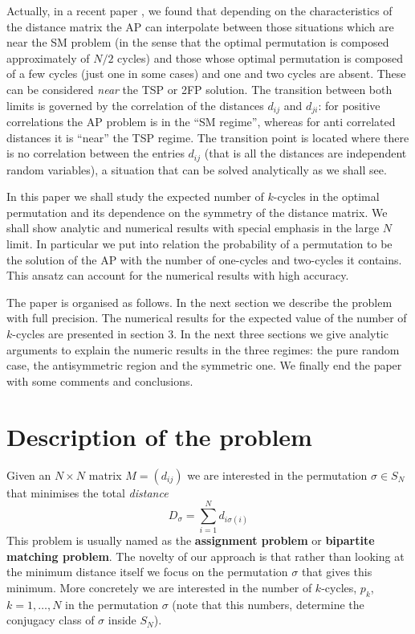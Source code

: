 \documentclass[]{iopart}
\begin{document}
 Actually, in a recent paper \cite{EstFal}, we found that 
 depending on the characteristics of the distance matrix the AP can interpolate
 between those situations which are near the 
 SM problem (in the sense that the optimal permutation is composed
 approximately of $N/2$ cycles) and those whose 
 optimal permutation is composed of a few cycles 
(just one in some cases) and one and two cycles are absent. 
These can be considered {\it near} the TSP or 2FP solution.
 The transition between both limits is governed by 
 the correlation of the distances $d_{{i}{j}}$ and $d_{{j}{i}}$:
 for positive correlations the AP problem is in
 the ``SM regime'', whereas for anti correlated distances it is
 ``near'' the TSP regime. The transition point is located where there is no
 correlation between the entries $d_{{i}{j}}$
 (that is all the distances are independent random variables), 
a situation that can be solved analytically as we shall see.


In this paper we shall study the expected number of $k$-cycles in the optimal
permutation and its dependence on the symmetry of the distance matrix. 
We shall show  analytic and numerical results with special emphasis in the 
large  $N$ limit. In particular we put into relation the probability of a permutation
to be the solution of the AP with the number of one-cycles and two-cycles 
it contains. This ansatz can account for the numerical results
with high accuracy.

The paper is organised as follows. In the next section we 
describe the problem with full precision. The numerical 
results for the expected value of the number of $k$-cycles
are presented in section 3. In the next three sections
we give analytic arguments to explain the numeric results
in the three regimes: the pure random case, the antisymmetric region 
and the symmetric one. We finally end the paper with some comments and 
conclusions.

\section{Description of the problem}

Given an $N\times N$ matrix $M=(d_{{i}{j}})$ we are interested in the
permutation $\sigma\in S_N$ that minimises the total {\it distance}
$$D_\sigma=\sum_{i=1}^Nd_{i\sigma(i)}$$
This problem is usually named as the {\bf assignment problem} or 
{\bf bipartite matching problem}.
The novelty of our approach is that rather than looking
at the minimum distance itself we focus on the permutation
$\sigma$ that gives this minimum. More concretely we are interested
in the number of $k$-cycles, $p_k$, $k=1,\dots,N$ in the 
permutation $\sigma$ (note that this numbers, determine the 
conjugacy class of $\sigma$ inside $S_N$).
\end{document}
